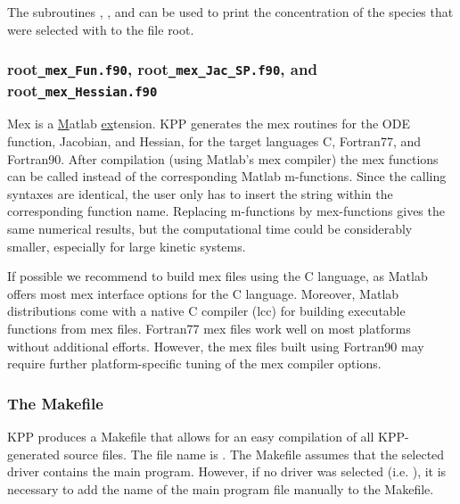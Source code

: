 \documentclass[twoside]{article}
\newcommand{\kpproot}{{\sc root}}
\begin{document}
The subroutines , , and
 can be used to print the concentration of the
species that were selected with  to the file
\kpproot{}.

\subsubsection{\kpproot{\tt\_mex\_Fun.f90},
  \kpproot{\tt\_mex\_Jac\_SP.f90}, and \kpproot{\tt\_mex\_Hessian.f90}}
\label{sec:output-mexcode}

Mex is a \underline{M}atlab \underline{ex}tension. KPP generates the mex
routines for the ODE function, Jacobian, and Hessian, for the target
languages C, Fortran77, and Fortran90. After compilation (using Matlab's
mex compiler) the mex functions can be called instead of the
corresponding Matlab m-functions. Since the calling syntaxes are
identical, the user only has to insert the  string within the
corresponding function name. Replacing m-functions by mex-functions
gives the same numerical results, but the computational time could be
considerably smaller, especially for large kinetic systems.

If possible we recommend to build mex files using the C language, as
Matlab offers most mex interface options for the C language. Moreover,
Matlab distributions come with a native C compiler (lcc) for building
executable functions from mex files. Fortran77 mex files work well on
most platforms without additional efforts. However, the mex files built
using Fortran90 may require further platform-specific tuning of the mex
compiler options.

\subsubsection{The Makefile}
\label{sec:output-makefile}

KPP produces a Makefile that allows for an easy compilation of all
KPP-generated source files. The file name is \code{Makefile_}\kpproot.
The Makefile assumes that the selected driver contains the main program.
However, if no driver was selected (i.e. ), it is
necessary to add the name of the main program file manually to the
Makefile.
\end{document}
